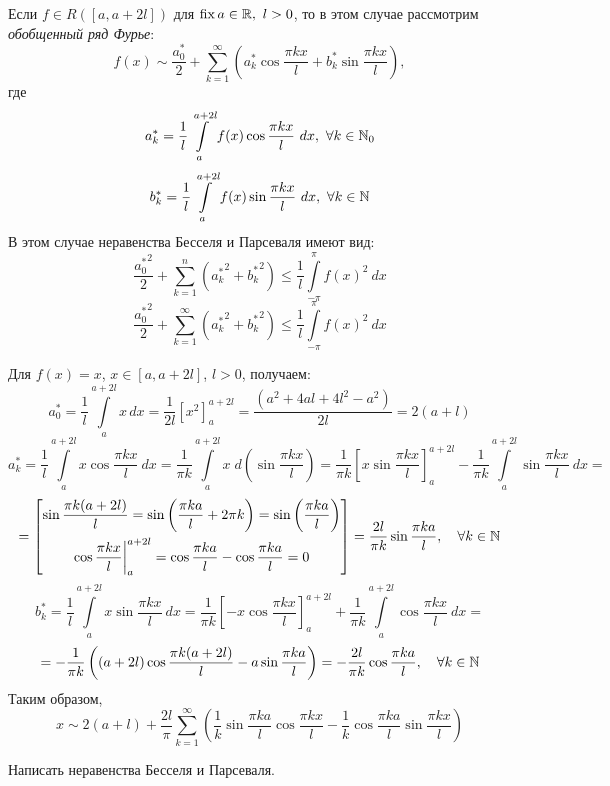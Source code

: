 \documentclass[../../main.tex]{subfiles}
\begin{document}
	Если $f \in R\left( [a,a+2l]\right)$ для $\operatorname{fix} a \in \mathbb{R},\ l > 0$, то в 
	этом случае рассмотрим \emph{обобщенный ряд Фурье}:
	\begin{equation}
	\label{17:25}
	 f(x) \sim \frac{a_0^*}{2} + \sum_{k=1}^{\infty} \left( a_k^* \cos{\frac{\pi 
	 k x}{l}} + b_k^* \sin{\frac{\pi k x}{l}} \right),
	\end{equation}
	где
	\begin{equation}
	\label{17:26}
	a_k^* = \frac{1}{l} \int\limits_{a}^{a+2l} f(x) \cos{\frac{\pi k x}{l}} \ 
	dx,\ 
	\forall k \in \N_0
	\end{equation}
	\begin{equation}
	\label{17:27}
	b_k^* = \frac{1}{l} \int\limits_{a}^{a+2l} f(x) \sin{\frac{\pi k x}{l}} \ 
	dx,\ 
	\forall k \in \N
	\end{equation}
	В этом случае неравенства Бесселя и Парсеваля имеют вид:
	\begin{equation}
	\label{17:28}
	\frac{{a_0^*}^2}{2} + \sum_{k=1}^{n} \left( {a_k^*}^2 + {b_k^*}^2\right) \le 
	\frac{1}{l}  \int\limits_{-\pi}^{\pi} f(x)^2 \ dx
	\end{equation}
	\begin{equation}
	\label{17:29}
	\frac{{a_0^*}^2}{2} + \sum_{k=1}^{\infty} \left( {a_k^*}^2 + {b_k^*}^2\right) 
	\le \frac{1}{l}  \int\limits_{-\pi}^{\pi} f(x)^2 \ dx
	\end{equation}
	\begin{exmp}
	Для $f(x) = x$, $x \in [a,a+2l]$, $l > 0$, получаем:
	\[ a_0^* = \frac{1}{l} \int\limits_{a}^{a+2l} x\, dx = \frac{1}{2l} \left[x^2 
	\right]_{a}^{a+2l} = \frac{\left( a^2 + 4al + 4l^2 - a^2 \right) }{2l}=2(a+l) 
	 \]
	\[  a_k^* = \frac{1}{l} \int\limits_{a}^{a+2l} x \cos{\frac{\pi k x}{l}} \ dx 
	= \frac{1}{\pi k}  \int\limits_{a}^{a+2l} x \; d \left(\sin{\frac{\pi k 
	x}{l}} 
	\right) = \frac{1}{\pi k} \left[ x \sin{\frac{\pi k x}{l}} \right]_{a}^{a+2l} 
	- \frac{1}{\pi k} \int\limits_{a}^{a+2l} \sin{\frac{\pi k x}{l}} \ dx =\]
	\[ = \left[ \begin{gathered} 
	\sin{\frac{\pi k (a+2l)}{l}} = \sin{\left( \frac{\pi k a}{l} + 2\pi k\right)} 
	= \sin{\left( \frac{\pi k a}{l} \right)}  \\
	\cos{ \frac{\pi k x}{l} } \bigg|_{a}^{a+2l} = \cos{ \frac{\pi k a}{l} } - 
	\cos{ \frac{\pi k a}{l} } = 0
	\end{gathered}\right] =\frac{2l}{\pi k} \sin{\frac{\pi k a}{l}}, \quad 
	\forall k \in \mathbb{N}     \]
	\[  b_k^* = \frac{1}{l} \int\limits_{a}^{a+2l} x \sin{\frac{\pi k x}{l}} \ dx 
	= \frac{1}{\pi k} \left[ - x \cos{\frac{\pi k x}{l}} \right]_{a}^{a+2l} + 
	\frac{1}{\pi k} \int\limits_{a}^{a+2l} \cos{\frac{\pi k x}{l}} \ dx =         
	   \]
	\[= - \frac{1}{\pi k} \left( \left(a+2l \right)\cos{\frac{\pi k (a+2l)}{l}} - 
	a \sin{\frac{\pi k a}{l}} \right)  = -\frac{2l}{\pi k} \cos{\frac{\pi k 
	a}{l}}, \quad \forall k \in \mathbb{N}     \]
	Таким образом,
	\[ x \sim 2(a+l) + \frac{2l}{\pi} \sum_{k=1}^{\infty}\left(  \frac{1}{k} 
	\sin{\frac{\pi k a}{l}} \cos{\frac{\pi k x}{l}} - \frac{1}{k} \cos{\frac{\pi 
	k a}{l}} \sin{\frac{\pi k x}{l}} \right) \]
	\end{exmp}
	\begin{exercise}
		Написать неравенства Бесселя и Парсеваля.
	\end{exercise}
\end{document}
